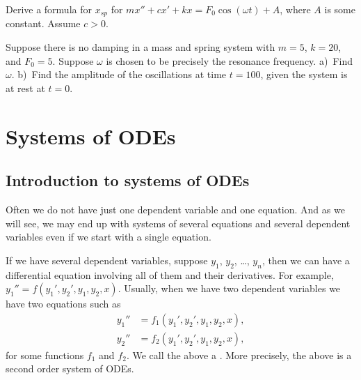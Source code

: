 \documentclass[12pt]{book}
\begin{document}
\begin{exercise}
Derive a formula for $x_{sp}$ for
$mx''+cx'+kx = F_0 \cos(\omega t) + A$,
where $A$ is some constant.  Assume $c > 0$.
\end{exercise}

\begin{exercise}
Suppose there is no damping in a mass and spring system with
$m = 5$, $k= 20$, and $F_0 = 5$.  Suppose $\omega$ is chosen
to be precisely the resonance frequency.  a)~Find $\omega$.  b)~Find
the amplitude of the oscillations at time $t=100$, given the system is at
rest at $t=0$.
\end{exercise}


\chapter{Systems of ODEs} \label{sys:chapter}


\section{Introduction to systems of ODEs} \label{sec:introtosys}


Often we do not have just one dependent variable and one equation.
And as we will see, we may end up with systems of several
equations and several dependent variables even if we start with a single
equation.

If we have several dependent variables, suppose $y_1$, $y_2$, \ldots, $y_n$,
then
we can have a differential equation involving all of them and their
derivatives.  For example, $y_1'' = f(y_1',y_2',y_1,y_2,x)$.
Usually, when we have two dependent variables we have two equations
such as
\begin{align*}
y_1'' & = f_1(y_1',y_2',y_1,y_2,x) , \\
y_2'' & = f_2(y_1',y_2',y_1,y_2,x) ,
\end{align*}
for some functions $f_1$ and $f_2$.  We call the above a
\emph{}.
More precisely, the above is a second order system of ODEs.
\end{document}
